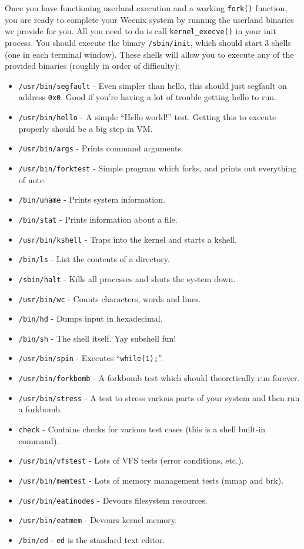 Once you have functioning userland execution and a working \texttt{fork()} function, you are ready to complete your Weenix system by running the userland binaries we provide for you. All you need to do is call \texttt{kernel\_execve()} in your init process. You should execute the binary \texttt{/sbin/init}, which should start 3 shells (one in each terminal window). These shells will allow you to execute any of the provided binaries (roughly in order of difficulty):
\begin{itemize}
    \item \texttt{/usr/bin/segfault} - Even simpler than hello, this should just segfault on address \texttt{0x0}. Good if you're having a lot of trouble getting hello to run.
    \item \texttt{/usr/bin/hello} - A simple ``Hello world!'' test. Getting this to execute properly should be a big step in VM.
    \item \texttt{/usr/bin/args} - Prints command arguments.
    \item \texttt{/usr/bin/forktest} - Simple program which forks, and prints out everything of note.
    \item \texttt{/bin/uname} - Prints system information.
    \item \texttt{/bin/stat} - Prints information about a file.
    \item \texttt{/usr/bin/kshell} - Traps into the kernel and starts a kshell.
    \item \texttt{/bin/ls} - List the contents of a directory.
    \item \texttt{/sbin/halt} - Kills all processes and shuts the system down.
    \item \texttt{/usr/bin/wc} - Counts characters, words and lines.
    \item \texttt{/bin/hd} - Dumps input in hexadecimal.
    \item \texttt{/bin/sh} - The shell itself. Yay subshell fun!
    \item \texttt{/usr/bin/spin} - Executes ``\texttt{while(1);}''.
    \item \texttt{/usr/bin/forkbomb} - A forkbomb test which should theoretically run forever.
    \item \texttt{/usr/bin/stress} - A test to stress various parts of your system and then run a forkbomb.
    \item \texttt{check} - Contains checks for various test cases (this is a shell built-in command).
    \item \texttt{/usr/bin/vfstest} - Lots of VFS tests (error conditions, etc.).
    \item \texttt{/usr/bin/memtest} - Lots of memory management tests (mmap and brk).
    \item \texttt{/usr/bin/eatinodes} - Devours filesystem resources.
    \item \texttt{/usr/bin/eatmem} - Devours kernel memory.
    \item \texttt{/bin/ed} - \texttt{ed} is the standard text editor.
\end{itemize}

